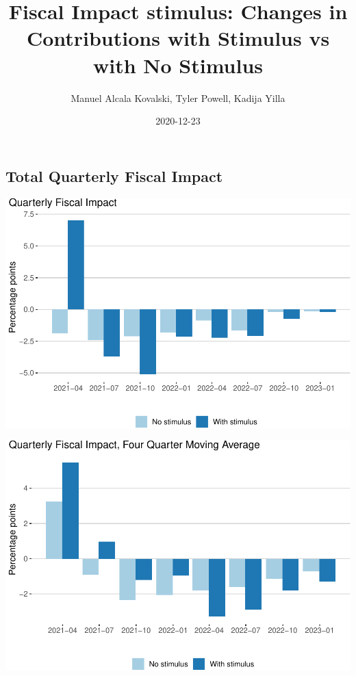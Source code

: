 \documentclass[
]{article}
\title{Fiscal Impact stimulus: Changes in Contributions with Stimulus vs
with No Stimulus}
\author{Manuel Alcala Kovalski, Tyler Powell, Kadija Yilla}
\date{2020-12-23}
\begin{document}
\maketitle

\hypertarget{total-quarterly-fiscal-impact}{%
\subsection{Total Quarterly Fiscal
Impact}\label{total-quarterly-fiscal-impact}}

\begin{center}\includegraphics{stimulus-changes_files/figure-latex/fim-1} \end{center}

\begin{center}\includegraphics{stimulus-changes_files/figure-latex/fim-ma-1} \end{center}
\end{document}
